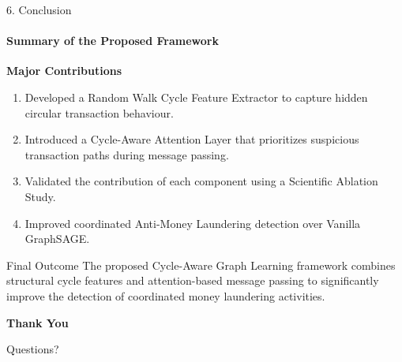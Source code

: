 \documentclass[aspectratio=169,11pt]{beamer}
\begin{document}
\begin{frame}{6. Conclusion}

\framesubtitle{Summary of the Proposed Framework}

{\footnotesize
\textbf{Major Contributions}

\vspace{0.15cm}

\begin{enumerate}\setlength{\itemsep}{3pt}\setlength{\parskip}{0pt}

\item Developed a Random Walk Cycle Feature Extractor to capture hidden circular transaction behaviour.

\item Introduced a Cycle-Aware Attention Layer that prioritizes suspicious transaction paths during message passing.

\item Validated the contribution of each component using a Scientific Ablation Study.

\item Improved coordinated Anti-Money Laundering detection over Vanilla GraphSAGE.

\end{enumerate}

\vspace{0.25cm}

\begin{block}{Final Outcome}
The proposed Cycle-Aware Graph Learning framework combines structural cycle features and attention-based message passing to significantly improve the detection of coordinated money laundering activities.
\end{block}
}

\end{frame}


\begin{frame}

\centering

\vspace{1.5cm}

{\Huge\textbf{\textcolor{amritaMaroon}{Thank You}}}

\vspace{0.5cm}

{\Large Questions?}

\end{frame}
\end{document}

